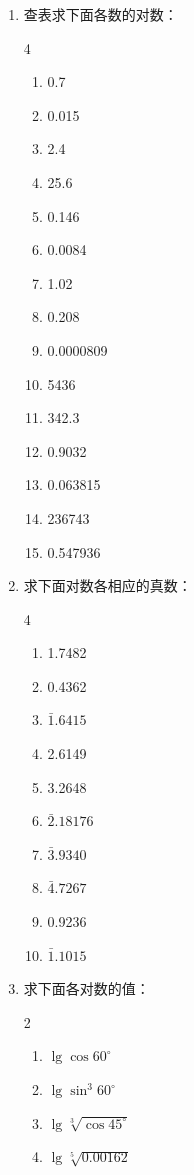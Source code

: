 \begin{ex}
\begin{enumerate}
    \item 查表求下面各数的对数：
\begin{multicols}{4}
\begin{enumerate}
    \item 0.7
    \item 0.015
    \item 2.4
    \item 25.6
    \item 0.146
    \item 0.0084
    \item 1.02
    \item 0.208
    \item 0.0000809
    \item 5436
    \item 342.3
    \item 0.9032
    \item 0.063815
    \item 236743
    \item 0.547936
\end{enumerate}
\end{multicols}
    \item 求下面对数各相应的真数：
    \begin{multicols}{4}
        \begin{enumerate}
            \item 1.7482
            \item 0.4362
            \item $\bar{1}.6415$
            \item 2.6149
            \item 3.2648
            \item $\bar{2}.18176$
            \item $\bar{3}.9340$
            \item $\bar{4}.7267$
            \item 0.9236
            \item $\bar{1}.1015$
        \end{enumerate}
        \end{multicols}   
    \item 求下面各对数的值：
     \begin{multicols}{2}
        \begin{enumerate}
            \item $\lg\cos60^{\circ}$
            \item $\lg\sin^3 60^{\circ}$
            \item $\lg\sqrt[3]{\cos 45^{\circ}}$
            \item $\lg\sqrt[5]{0.00162}$
        \end{enumerate}
        \end{multicols}    
\end{enumerate}
\end{ex}

